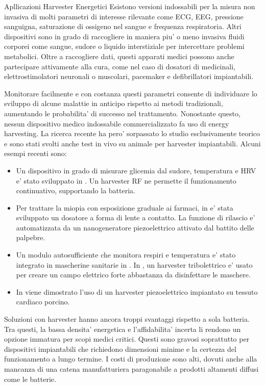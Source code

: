 \begin{section}{Apllicazioni Harvester Energetici}
    Esistono versioni indossabili per la misura non invasiva di molti parametri di interesse rilevante come ECG, EEG, pressione sanguigna, saturazione di ossigeno nel sangue e frequenza respiratoria. Altri dispositivi sono in grado di raccogliere in maniera piu' o meno invasiva fluidi corporei come sangue, sudore o liquido interstiziale per intercettare problemi metabolici. Oltre a raccogliere dati, questi apparati medici possono anche partecipare attivamente alla cura, come nel caso di dosatori di medicinali, elettrostimolatori neuronali o muscolari, pacemaker e defibrillatori impiantabili.
    
    Monitorare facilmente e con costanza questi parametri consente di individuare lo sviluppo di alcune malattie in anticipo rispetto ai metodi tradizionali, aumentando le probabilita' di successo nel trattamento. Nonostante questo, nessun dispositivo medico indossabile commercializzato fa uso di energy harvesting. La ricerca recente ha pero' sorpassato lo studio esclusivamente teorico e sono stati svolti anche test in vivo su animale per harvester impiantabili. Alcuni esempi recenti sono: \begin{itemize}
        \item Un dispositivo in grado di misurare glicemia dal sudore, temperatura e HRV e' stato sviluppato in \cite{mirlouContinuousGlycemicMonitoring2024}. Un harvester RF ne permette il funzionamento continuativo, supportando la batteria.
        \item Per trattare la miopia con esposizione graduale ai farmaci, in \cite{jiangSelfgeneratedElectricitydrivenDrug2024} e' stata sviluppato un dosatore a forma di lente a contatto. La funzione di rilascio e' automatizzata da un nanogeneratore piezoelettrico attivato dal battito delle palpebre.
        \item Un modulo autosufficiente che monitora respiri e temperatura e' stato integrato in mascherine sanitarie in \cite{lanHighefficientIntelligentAntibacterial2024}. In \cite{simInstantDisinfectingFace}, un harvester tribolettrico e' usato per creare un campo elettrico forte abbastanza da disinfettare le maschere.
        \item In \cite{PanVivoFlexibleEnergy2024} viene dimostrato l'uso di un harvester piezoelettrico impiantato su tessuto cardiaco porcino.
    \end{itemize}
 
    Soluzioni con harvester hanno ancora troppi svantaggi rispetto a sola batteria. Tra questi, la bassa densita' energetica e l'affidabilita' incerta li rendono un opzione immatura per scopi medici critici. Questi sono gravosi soprattutto per dispositivi impiantabili che richiedono dimensioni minime e la certezza del funzionamento a lungo termine. I costi di produzione sono alti, dovuti anche alla mancanza di una catena manufatturiera paragonabile a prodotti altamenti diffusi come le batterie.


\end{section}
